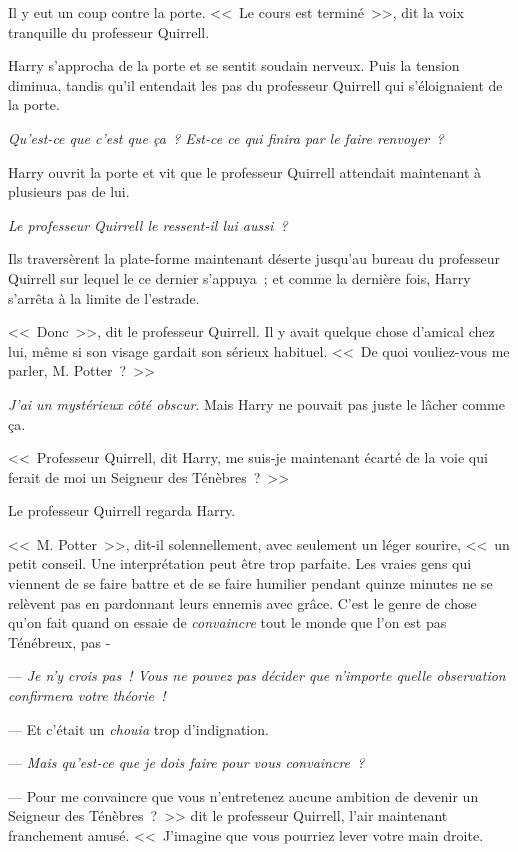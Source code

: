 Il y eut un coup contre la porte. <<~Le cours est terminé~>>, dit la voix tranquille du professeur Quirrell.

Harry s'approcha de la porte et se sentit soudain nerveux. Puis la tension diminua, tandis qu'il entendait les pas du professeur Quirrell qui s'éloignaient de la porte.

\emph{Qu'est-ce que c'est que ça~? Est-ce ce qui finira par le faire renvoyer~?}

Harry ouvrit la porte et vit que le professeur Quirrell attendait maintenant à plusieurs pas de lui.

\emph{Le professeur Quirrell le ressent-il lui aussi~?}

Ils traversèrent la plate-forme maintenant déserte jusqu'au bureau du professeur Quirrell sur lequel le ce dernier s'appuya~; et comme la dernière fois, Harry s'arrêta à la limite de l'estrade.

<<~Donc~>>, dit le professeur Quirrell. Il y avait quelque chose d'amical chez lui, même si son visage gardait son sérieux habituel. <<~De quoi vouliez-vous me parler, M. Potter~?~>>

\emph{J'ai un mystérieux côté obscur}. Mais Harry ne pouvait pas juste le lâcher comme ça.

<<~Professeur Quirrell, dit Harry, me suis-je maintenant écarté de la voie qui ferait de moi un Seigneur des Ténèbres~?~>>

Le professeur Quirrell regarda Harry.

<<~M. Potter~>>, dit-il solennellement, avec seulement un léger sourire, <<~un petit conseil. Une interprétation peut être trop parfaite. Les vraies gens qui viennent de se faire battre et de se faire humilier pendant quinze minutes ne se relèvent pas en pardonnant leurs ennemis avec grâce. C'est le genre de chose qu'on fait quand on essaie de \emph{convaincre} tout le monde que l'on est pas Ténébreux, pas -

--- \emph{Je n'y crois pas~! Vous ne pouvez pas décider que n'importe quelle observation confirmera votre théorie~!}

--- Et c'était un \emph{chouia} trop d'indignation.

--- \emph{Mais qu'est-ce que je dois faire pour vous convaincre~?}

--- Pour me convaincre que vous n'entretenez aucune ambition de devenir un Seigneur des Ténèbres~?~>> dit le professeur Quirrell, l'air maintenant franchement amusé. <<~J'imagine que vous pourriez lever votre main droite.

